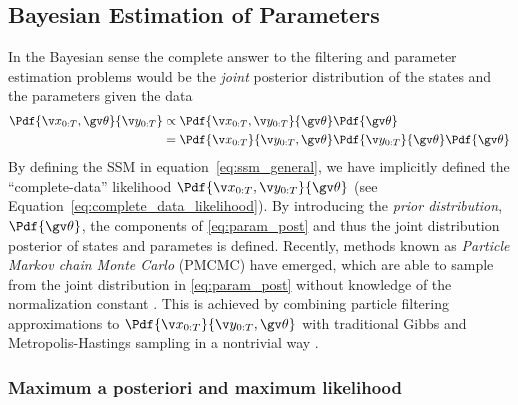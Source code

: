 \subsection{Bayesian Estimation of Parameters}%
In the Bayesian sense the complete 
answer to the filtering and parameter estimation problems would be the \emph{joint} posterior distribution of the states
and the parameters given the data
\begin{align}
	\Pdf{\X,\Th}{\Y} &\propto \Pdf{\X,\Y}{\Th}\Pdf{\Th}\\
	&= \Pdf{\X}{\Y,\Th}\Pdf{\Y}{\Th}\Pdf{\Th}
	\label{eq:param_post}
\end{align}
By defining the SSM in equation~\eqref{eq:ssm_general}, we have
implicitly defined the ``complete-data'' likelihood $\Pdf{\X,\Y}{\Th}$
(see Equation~\eqref{eq:complete_data_likelihood}).
By introducing the \emph{prior distribution}, $\Pdf{\Th}$,
the components of \eqref{eq:param_post} and thus the joint distribution posterior
of states and parametes is defined. Recently, methods known as
\emph{Particle Markov chain Monte Carlo} (PMCMC) have emerged,
which are able to sample from the joint distribution in \eqref{eq:param_post}
without knowledge of the normalization constant \parencite{Andrieu2010}.
This is achieved by combining particle filtering approximations to $\Pdf{\X}{\Y,\Th}$ 
with traditional Gibbs and Metropolis-Hastings sampling in a nontrivial way 
\parencite{Andrieu2010,gelman2004}.

\subsubsection{Maximum a posteriori and maximum likelihood}

